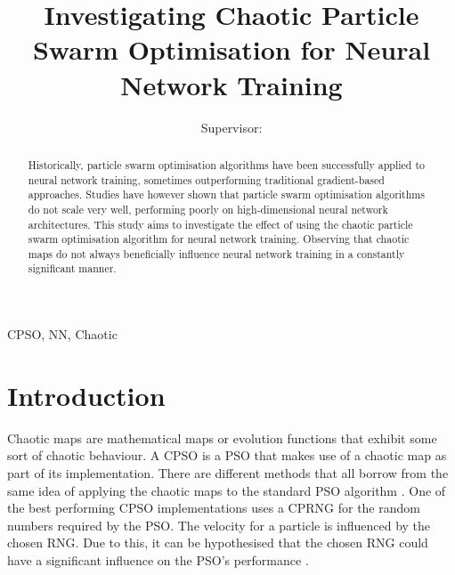 \documentclass[conference]{IEEEtran}
\begin{document}
\title{Investigating Chaotic Particle Swarm Optimisation for Neural Network Training\\
}

\author{
\and
Supervisor:\\
}

\maketitle

\begin{abstract}
Historically, particle swarm optimisation algorithms have been successfully applied to neural network training, sometimes outperforming traditional gradient-based approaches. Studies have however shown that particle swarm optimisation algorithms do not scale very well, performing poorly on high-dimensional neural network architectures. This study aims to investigate the effect of using the chaotic particle swarm optimisation algorithm for neural network training. Observing that chaotic maps do not always beneficially influence neural network training in a constantly significant manner.
\end{abstract}

\begin{IEEEkeywords}
CPSO, NN, Chaotic
\end{IEEEkeywords}

\section{Introduction}
Chaotic maps are mathematical maps or evolution functions that exhibit some sort of chaotic behaviour. A \ac{CPSO} is a \ac{PSO} that makes use of a chaotic map as part of its implementation. There are different methods that all borrow from the same idea of applying the chaotic maps to the standard \ac{PSO} algorithm  \cite{pluhacek:cpso-iw, pluhacek:cpso-cprng-imp}. One of the best performing \ac{CPSO} implementations uses a \ac{CPRNG} for the random numbers required by the \ac{PSO}. The velocity for a particle is influenced by the chosen \ac{RNG}. Due to this, it can be hypothesised that the chosen \ac{RNG} could have a significant influence on the \ac{PSO}'s performance \cite{pluhacek:cpso-cprng-imp}.
\end{document}

